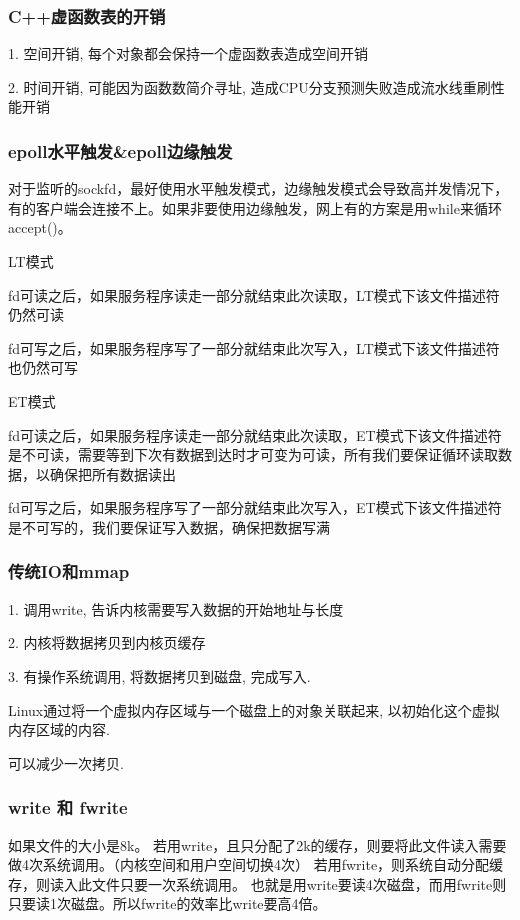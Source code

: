 \documentclass[UTF8]{ctexart}
\begin{document}
\subsubsection{C++虚函数表的开销}
1. 空间开销, 每个对象都会保持一个虚函数表造成空间开销 \par
2. 时间开销, 可能因为函数数简介寻址, 造成CPU分支预测失败造成流水线重刷性能开销 \par
\subsubsection{epoll水平触发\&epoll边缘触发}
对于监听的sockfd，最好使用水平触发模式，边缘触发模式会导致高并发情况下，有的客户端会连接不上。如果非要使用边缘触发，网上有的方案是用while来循环accept()。 \par
LT模式 \par
fd可读之后，如果服务程序读走一部分就结束此次读取，LT模式下该文件描述符仍然可读\par
fd可写之后，如果服务程序写了一部分就结束此次写入，LT模式下该文件描述符也仍然可写\par
ET模式 \par
fd可读之后，如果服务程序读走一部分就结束此次读取，ET模式下该文件描述符是不可读，需要等到下次有数据到达时才可变为可读，所有我们要保证循环读取数据，以确保把所有数据读出 \par
fd可写之后，如果服务程序写了一部分就结束此次写入，ET模式下该文件描述符是不可写的，我们要保证写入数据，确保把数据写满 \par
\subsubsection{传统IO和mmap}
1. 调用write, 告诉内核需要写入数据的开始地址与长度 \par
2. 内核将数据拷贝到内核页缓存 \par
3. 有操作系统调用, 将数据拷贝到磁盘, 完成写入. \par
Linux通过将一个虚拟内存区域与一个磁盘上的对象关联起来, 以初始化这个虚拟内存区域的内容. \par
可以减少一次拷贝.

\subsubsection{write 和 fwrite}
如果文件的大小是8k。
若用write，且只分配了2k的缓存，则要将此文件读入需要做4次系统调用。（内核空间和用户空间切换4次）
若用fwrite，则系统自动分配缓存，则读入此文件只要一次系统调用。
也就是用write要读4次磁盘，而用fwrite则只要读1次磁盘。所以fwrite的效率比write要高4倍。
\end{document}

